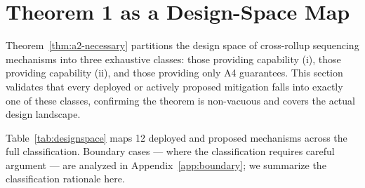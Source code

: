 %

\section{Theorem 1 as a Design-Space Map}
\label{sec:designspace}

Theorem~\ref{thm:a2-necessary} partitions the design space of cross-rollup
sequencing mechanisms into three exhaustive classes: those providing capability
(i), those providing capability (ii), and those providing only A4 guarantees.
This section validates that every deployed or actively proposed mitigation
falls into exactly one of these classes, confirming the theorem is non-vacuous
and covers the actual design landscape.

Table~\ref{tab:designspace} maps 12 deployed and proposed mechanisms across
the full classification. Boundary cases --- where the classification requires
careful argument --- are analyzed in Appendix~\ref{app:boundary}; we summarize
the classification rationale here.

